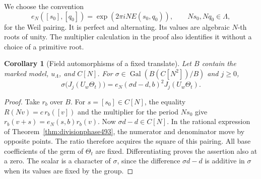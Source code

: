 \documentclass[a4paper,11pt]{article}
\newtheorem{corollary}[proposition]{Corollary}
\theoremstyle{definition}
\theoremstyle{remark}
\numberwithin{equation}{section}
\begin{document}
We choose the convention
\[
 e_N([s_0],[q_0])=\exp(2\pi iN E(s_0,q_0)),
       \qquad Ns_0,Nq_0\in\Lambda ,
\]
for the Weil pairing. It is perfect and alternating. Its
values are algebraic \(N\)-th roots of unity. The multiplier
calculation in the proof also identifies it without a choice of
a primitive root.

\begin{corollary}[Field automorphisms of a fixed translate]\leavevmode
\label{cor:deckphase493}
Let \(B\) contain the marked model, \(u_\Lambda\), and \(C[N]\).
For \(\sigma\in\operatorname{Gal}(B(C[N^2])/B)\) and \(j\ge0\),
\[
  \sigma\big(J_j(U_w\Theta_t)\big)=
       e_N(\sigma d-d,b)^2 J_j(U_w\Theta_t).
\]
\end{corollary}
\begin{proof}
Take \(r_b\) over \(B\). For \(s=[s_0]\in C[N]\), the equality
\(R(Nv)=c\,r_b([v])\) and the multiplier for the period \(Ns_0\)
give \(r_b(v+s)=e_N(s,b)r_b(v)\).
Now \(\sigma d-d\in C[N]\). In the rational expression of
Theorem~\ref{thm:divisionphase493}, the numerator and denominator
move by opposite points. The ratio therefore acquires the
square of this pairing. All base coefficients of the germ of
\(\Theta_t\) are fixed. Differentiating proves the assertion
also at a zero. The scalar is a character of \(\sigma\), since
the difference \(\sigma d-d\) is additive in \(\sigma\) when its
values are fixed by the group.
\end{proof}
\end{document}
